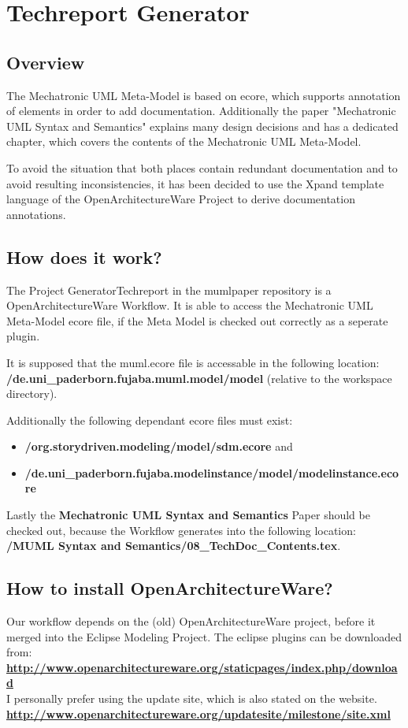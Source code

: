 \chapter{Techreport Generator}
\section{Overview}
The Mechatronic UML Meta-Model is based on ecore, which supports annotation of
elements in order to add documentation.
Additionally the paper "Mechatronic UML Syntax and Semantics" explains many
design decisions and has a dedicated chapter, which covers the contents of the
Mechatronic UML Meta-Model.

To avoid the situation that both places contain redundant documentation and to
avoid resulting inconsistencies, it has been decided to use the Xpand
template language of the OpenArchitectureWare Project to derive documentation
annotations.

\section{How does it work?}
The Project GeneratorTechreport in the mumlpaper repository is a
OpenArchitectureWare Workflow.
It is able to access the Mechatronic UML Meta-Model ecore file, if the Meta
Model is checked out correctly as a seperate plugin.

It is supposed that the muml.ecore file is accessable in the following
location:\\
\textbf{/de.uni\_paderborn.fujaba.muml.model/model}
(relative to the workspace directory).

Additionally the following dependant ecore files must exist:
\begin{itemize}
  \item \textbf{/org.storydriven.modeling/model/sdm.ecore} and
  \item \textbf{/de.uni\_paderborn.fujaba.modelinstance/model/modelinstance.ecore}
\end{itemize}

Lastly the \textbf{Mechatronic UML Syntax and Semantics} Paper should be checked
out, because the Workflow generates into the following location:\\
\textbf{/MUML Syntax and Semantics/08\_TechDoc\_Contents.tex}.

\section{How to install OpenArchitectureWare?}
Our workflow depends on the (old) OpenArchitectureWare project, before it merged
into the Eclipse Modeling Project. The eclipse plugins can be downloaded from:\\
\href{http://www.openarchitectureware.org/staticpages/index.php/download}
{\textbf{http://www.openarchitectureware.org/staticpages/index.php/download}}
\\
I personally prefer using the update site, which is also stated on the
website.\\
\href{http://www.openarchitectureware.org/updatesite/milestone/site.xml}
{\textbf{http://www.openarchitectureware.org/updatesite/milestone/site.xml}}

